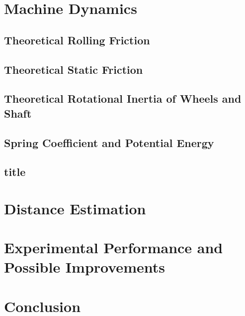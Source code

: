 \documentclass[a4paper]{article}
\begin{document}
\clearpage

\section{Machine Dynamics}
\subsection{Theoretical Rolling Friction}

\subsection{Theoretical Static Friction}

\subsection{Theoretical Rotational Inertia of Wheels and Shaft}

\subsection{Spring Coefficient and Potential Energy}

\subsection{title}

\section{Distance Estimation}

\section{Experimental Performance and Possible Improvements}

\section{Conclusion}



\end{document}
